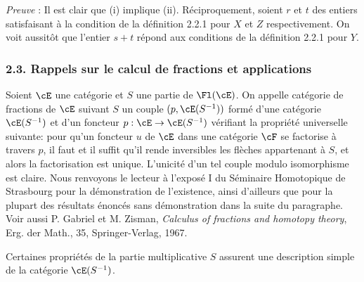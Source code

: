\emph{Preuve} : Il est clair que (i) implique (ii). Réciproquement, soient $r$ et $t$ des entiers satisfaisant à la condition de la définition 2.2.1 pour $X$ et $Z$ respectivement. On voit aussitôt que l'entier $s+t$ répond aux conditions de la définition 2.2.1 pour $Y$.

\subsubsection*{2.3. Rappels sur le calcul de fractions et applications}
Soient $\cE$ une catégorie et $S$ une partie de $\Fl(\cE)$. On appelle catégorie de fractions de $\cE$ suivant $S$ un couple $(p,\cE(S^{-1}))$ formé d'une catégorie $\cE(S^{-1})$ et d'un foncteur $p:\cE\to\cE(S^{-1})$ vérifiant la propriété universelle suivante: pour qu'un foncteur $u$ de $\cE$ dans une catégorie $\cF$ se factorise à travers $p$, il faut et il suffit qu'il rende inversibles les flèches appartenant à $S$, et alors la factorisation est unique. L'unicité d'un tel couple modulo isomorphisme est claire. Nous renvoyons le lecteur à l'exposé I du Séminaire Homotopique de Strasbourg pour la démonstration de l'existence, ainsi d'ailleurs que pour la plupart des résultats énoncés sans démonstration dans la suite du paragraphe. Voir aussi P. Gabriel et M. Zisman, \emph{Calculus of fractions and homotopy theory}, Erg. der Math., 35, Springer-Verlag, 1967.

Certaines propriétés de la partie multiplicative $S$ assurent une description simple de la catégorie $\cE(S^{-1})$.

